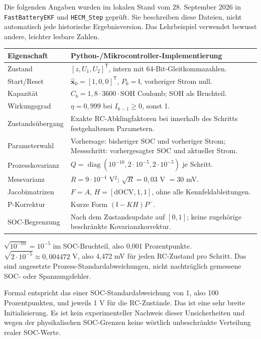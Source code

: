 \label{ecm:code}
Die folgenden Angaben wurden im lokalen Stand vom 28. September 2026 in \texttt{FastBatteryEKF} und \texttt{HECM\_Step} geprüft. Sie beschreiben diese Dateien, nicht automatisch jede historische Ergebnisversion. Das Lehrbeispiel verwendet bewusst andere, leichter lesbare Zahlen.

\begin{tabular}{p{.30\linewidth}p{.59\linewidth}}
\toprule Eigenschaft & Python-/Mikrocontroller-Implementierung\\\midrule
Zustand & $[z,U_1,U_2]^{\mathsf T}$, intern mit 64-Bit-Gleitkommazahlen.\\
Start/Reset & $\hat{\mathbf x}_0=[1,0,0]^{\mathsf T}$, $P_0=\mathsf I$, vorheriger Strom null.\\
Kapazität & $C_b=1{,}8\cdot3600\cdot\mathrm{SOH}$ Coulomb; SOH als Bruchteil.\\
Wirkungsgrad & $\eta=0{,}999$ bei $I_{k-1}\geq0$, sonst 1.\\
Zustandsübergang & Exakte RC-Abklingfaktoren bei innerhalb des Schritts festgehaltenen Parametern.\\
Parameterwahl & Vorhersage: bisheriger SOC und vorheriger Strom; Messschritt: vorhergesagter SOC und aktueller Strom.\\
Prozesskovarianz & $Q=\operatorname{diag}(10^{-10},2\cdot10^{-5},2\cdot10^{-5})$ je Schritt.\\
Messvarianz & $R=9\cdot10^{-4}$ V$^2$; $\sqrt R=0{,}03$ V $=30$ mV.\\
Jacobimatrizen & $F=A$, $H=[\mathrm{dOCV},1,1]$, ohne alle Kennfeldableitungen.\\
P-Korrektur & Kurze Form $(\mathsf I-KH)P^-$.\\
SOC-Begrenzung & Nach dem Zustandsupdate auf $[0,1]$; keine zugehörige beschränkte Kovarianzkorrektur.\\\bottomrule
\end{tabular}

$\sqrt{10^{-10}}=10^{-5}$ im SOC-Bruchteil, also 0,001 Prozentpunkte. $\sqrt{2\cdot10^{-5}}\approx0{,}004472$ V, also 4,472 mV für jeden RC-Zustand pro Schritt. Das sind angesetzte Prozess-Standardabweichungen, nicht nachträglich gemessene SOC- oder Spannungsfehler.

Formal entspricht das einer SOC-Standardabweichung von 1, also 100 Prozentpunkten, und jeweils 1 V für die RC-Zustände. Das ist eine sehr breite Initialisierung. Es ist kein experimenteller Nachweis dieser Unsicherheiten und wegen der physikalischen SOC-Grenzen keine wörtlich unbeschränkte Verteilung realer SOC-Werte.

